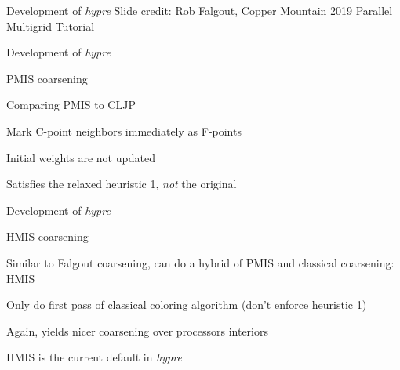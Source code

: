 \documentclass[18pt,xcolor=table]{beamer}
\begin{document}
\begin{frame}{Development of \emph{hypre}}
\tiny{Slide credit: Rob Falgout, Copper Mountain 2019 Parallel Multigrid Tutorial}
\end{frame}

\begin{frame}{Development of \emph{hypre}}
\begin{block}{PMIS coarsening}
\bit
\item Comparing PMIS to CLJP
\bit
\item Mark C-point neighbors immediately as F-points
\item Initial weights are not updated
\item Satisfies the relaxed heuristic 1, \emph{not} the original
\eit
\eit
\end{block}
\end{frame}

\begin{frame}{Development of \emph{hypre}}
\begin{block}{HMIS coarsening}
\bit
\item Similar to Falgout coarsening, can do a hybrid of PMIS and classical coarsening: HMIS
\item Only do first pass of classical coloring algorithm (don't enforce heuristic 1)
\item Again, yields nicer coarsening over processors interiors
\item HMIS is the current default in \emph{hypre}
\eit
\end{block}
\end{frame}
\end{document}
